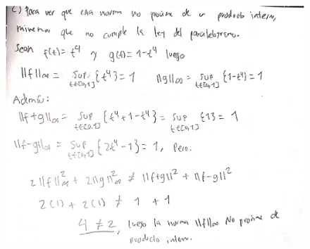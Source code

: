 \documentclass[fleqn]{article}
\begin{document}
\begin{enumerate}
\begin{enumerate}
\begin{figure}[H]
           \includegraphics[scale=.5]{figs/1c}
         \end{figure}
       \end{enumerate}


\end{enumerate}
\end{document}
